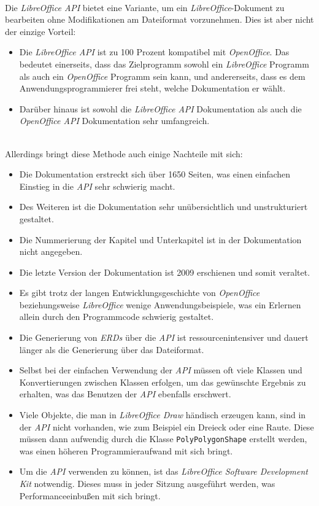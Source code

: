 \hon{}
\\
Die \textit{LibreOffice API} bietet eine Variante, um ein \textit{LibreOffice}-Dokument zu bearbeiten ohne Modifikationen am Dateiformat vorzunehmen. Dies ist aber nicht der einzige Vorteil:
\begin{itemize}
	\item Die \textit{LibreOffice API} ist zu 100 Prozent kompatibel mit \textit{OpenOffice}. Das bedeutet einerseits, dass das Zielprogramm sowohl ein \textit{LibreOffice} Programm als auch ein \textit{OpenOffice} Programm sein kann, und andererseits, dass es dem Anwendungsprogrammierer frei steht, welche Dokumentation er wählt. 
	\item Darüber hinaus ist sowohl die \textit{LibreOffice API} Dokumentation als auch die \textit{OpenOffice API} Dokumentation sehr umfangreich.
\end{itemize}
\noindent
\\
\noindent
Allerdings bringt diese Methode auch einige Nachteile mit sich:
\\
\begin{itemize}
	\item Die Dokumentation erstreckt sich über 1650 Seiten, was einen einfachen Einstieg in die \textit{API} sehr schwierig macht.
	\item Des Weiteren ist die Dokumentation sehr unübersichtlich und unstrukturiert gestaltet. 
	\item Die Nummerierung der Kapitel und Unterkapitel ist in der Dokumentation nicht angegeben.
	\item Die letzte Version der Dokumentation ist 2009 erschienen und somit veraltet.
	\item Es gibt trotz der langen Entwicklungsgeschichte von \textit{OpenOffice} beziehungsweise \textit{LibreOffice} wenige Anwendungsbeispiele, was ein Erlernen allein durch den Programmcode schwierig gestaltet.
	\item Die Generierung von \textit{ERDs} über die \textit{API} ist ressourcenintensiver und dauert länger als die Generierung über das Dateiformat.
	\item Selbst bei der einfachen Verwendung der \textit{API} müssen oft viele Klassen und Konvertierungen zwischen Klassen erfolgen, um das gewünschte Ergebnis zu erhalten, was das Benutzen der \textit{API} ebenfalls erschwert.   
	\item Viele Objekte, die man in \textit{LibreOffice Draw} händisch erzeugen kann, sind in der \textit{API} nicht vorhanden, wie zum Beispiel ein Dreieck oder eine Raute. Diese müssen dann aufwendig durch die Klasse \verb|PolyPolygonShape| erstellt werden, was einen höheren Programmieraufwand mit sich bringt.
	\item Um die \textit{API} verwenden zu können, ist das \textit{LibreOffice Software Development Kit} notwendig. Dieses muss in jeder Sitzung ausgeführt werden, was Performanceeinbußen mit sich bringt.
\end{itemize}

